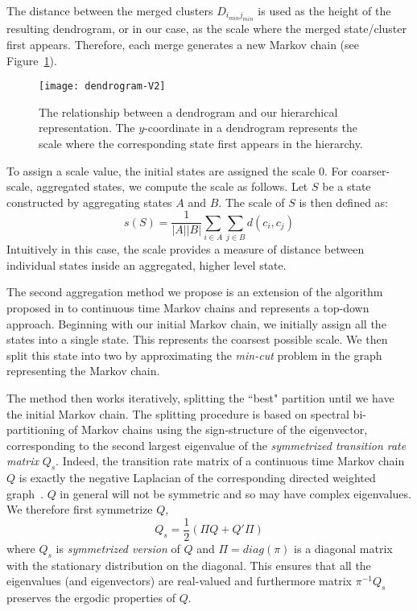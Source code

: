 The distance between the merged clusters $D_{i_{min} j_{min}}$ is used as the height of the resulting dendrogram, or in our case, as the scale where the merged state/cluster first appears. Therefore, each merge generates a new Markov chain (see Figure~\ref{fig:dendrogram}).%
\begin{figure}[h!]
	\centering
	\texttt{[image: dendrogram-V2]}
	\caption{The relationship between a dendrogram and our hierarchical representation. The $y$-coordinate in a dendrogram represents the scale where the corresponding state first appears in the hierarchy.}
	\label{fig:dendrogram}
\end{figure}
%
To assign a scale value, the initial states are assigned the scale $0$. For coarser-scale, aggregated states, we compute the scale as follows. Let $S$ be a state constructed by aggregating states $A$ and $B$.  The scale of $S$ is then defined as:
\begin{equation}
	\nonumber
	s(S) = \frac{1}{\left|A\right|\left|B\right|}\sum\limits_{i \in A}\sum\limits_{j \in B} d(c_i,c_j)
\end{equation}
Intuitively in this case, the scale provides a measure of distance between individual states inside an aggregated, higher level state.


The second aggregation method we propose is an extension of the algorithm proposed in \cite{5746509} to continuous time Markov chains and represents a top-down approach. Beginning with our initial Markov chain, we initially assign all the states into a single state. This represents the coarsest possible scale. We then split this state into two by approximating the \emph{min-cut} problem in the graph representing the Markov chain. 

The method then works iteratively, splitting the ``best" partition until we have the initial Markov chain.
%
The splitting procedure is based on spectral bi-partitioning of Markov chains using the sign-structure of the eigenvector, corresponding to the second largest eigenvalue of the \emph{symmetrized transition rate matrix} $Q_s$. Indeed,  the transition rate matrix of a continuous time Markov chain $Q$ is exactly the negative Laplacian of the corresponding directed weighted graph~\cite{Agaev2005157}.
%
$Q$ in general will not be symmetric and so may have complex eigenvalues. We therefore first symmetrize $Q$,
\begin{equation}
	\nonumber
	Q_s = \frac{1}{2}(\Pi Q + Q' \Pi)
\end{equation}
where $Q_s$ is \emph{symmetrized version} of $Q$ and $\Pi = diag(\pi)$ is a diagonal matrix with the stationary distribution on the diagonal. This ensures that all the eigenvalues (and eigenvectors) are real-valued and furthermore matrix $\pi^{-1}Q_s$ preserves the ergodic properties of $Q$. 

